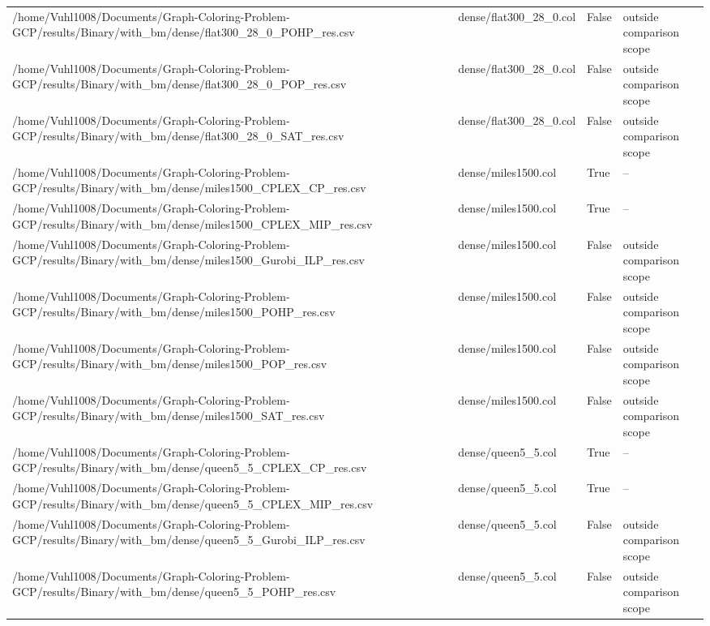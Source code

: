 \begin{table}[htbp]
\begin{tabular}{llll}
/home/Vuhl1008/Documents/Graph-Coloring-Problem-GCP/results/Binary/with\_bm/dense/flat300\_28\_0\_POHP\_res.csv & dense/flat300\_28\_0.col & False & outside comparison scope \\
/home/Vuhl1008/Documents/Graph-Coloring-Problem-GCP/results/Binary/with\_bm/dense/flat300\_28\_0\_POP\_res.csv & dense/flat300\_28\_0.col & False & outside comparison scope \\
/home/Vuhl1008/Documents/Graph-Coloring-Problem-GCP/results/Binary/with\_bm/dense/flat300\_28\_0\_SAT\_res.csv & dense/flat300\_28\_0.col & False & outside comparison scope \\
/home/Vuhl1008/Documents/Graph-Coloring-Problem-GCP/results/Binary/with\_bm/dense/miles1500\_CPLEX\_CP\_res.csv & dense/miles1500.col & True & -- \\
/home/Vuhl1008/Documents/Graph-Coloring-Problem-GCP/results/Binary/with\_bm/dense/miles1500\_CPLEX\_MIP\_res.csv & dense/miles1500.col & True & -- \\
/home/Vuhl1008/Documents/Graph-Coloring-Problem-GCP/results/Binary/with\_bm/dense/miles1500\_Gurobi\_ILP\_res.csv & dense/miles1500.col & False & outside comparison scope \\
/home/Vuhl1008/Documents/Graph-Coloring-Problem-GCP/results/Binary/with\_bm/dense/miles1500\_POHP\_res.csv & dense/miles1500.col & False & outside comparison scope \\
/home/Vuhl1008/Documents/Graph-Coloring-Problem-GCP/results/Binary/with\_bm/dense/miles1500\_POP\_res.csv & dense/miles1500.col & False & outside comparison scope \\
/home/Vuhl1008/Documents/Graph-Coloring-Problem-GCP/results/Binary/with\_bm/dense/miles1500\_SAT\_res.csv & dense/miles1500.col & False & outside comparison scope \\
/home/Vuhl1008/Documents/Graph-Coloring-Problem-GCP/results/Binary/with\_bm/dense/queen5\_5\_CPLEX\_CP\_res.csv & dense/queen5\_5.col & True & -- \\
/home/Vuhl1008/Documents/Graph-Coloring-Problem-GCP/results/Binary/with\_bm/dense/queen5\_5\_CPLEX\_MIP\_res.csv & dense/queen5\_5.col & True & -- \\
/home/Vuhl1008/Documents/Graph-Coloring-Problem-GCP/results/Binary/with\_bm/dense/queen5\_5\_Gurobi\_ILP\_res.csv & dense/queen5\_5.col & False & outside comparison scope \\
/home/Vuhl1008/Documents/Graph-Coloring-Problem-GCP/results/Binary/with\_bm/dense/queen5\_5\_POHP\_res.csv & dense/queen5\_5.col & False & outside comparison scope \\

\end{tabular}
\end{table}
